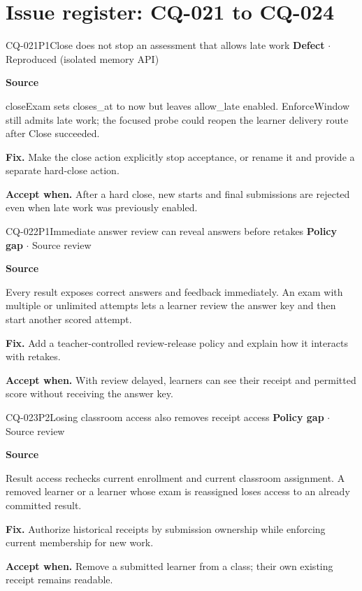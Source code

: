 \section*{Issue register: CQ-021 to CQ-024}
\begin{finding}{CQ-021}{P1}{Close does not stop an assessment that allows late work}
\textbf{Defect} $\cdot$ Reproduced (isolated memory API)\par
\textbf{Source}\quad{}\par
closeExam sets closes\_at to now but leaves allow\_late enabled. EnforceWindow still admits late work; the focused probe could reopen the learner delivery route after Close succeeded.\par
\textbf{Fix.} Make the close action explicitly stop acceptance, or rename it and provide a separate hard-close action.\par
\textbf{Accept when.} After a hard close, new starts and final submissions are rejected even when late work was previously enabled.
\end{finding}
\begin{finding}{CQ-022}{P1}{Immediate answer review can reveal answers before retakes}
\textbf{Policy gap} $\cdot$ Source review\par
\textbf{Source}\quad{}\par
Every result exposes correct answers and feedback immediately. An exam with multiple or unlimited attempts lets a learner review the answer key and then start another scored attempt.\par
\textbf{Fix.} Add a teacher-controlled review-release policy and explain how it interacts with retakes.\par
\textbf{Accept when.} With review delayed, learners can see their receipt and permitted score without receiving the answer key.
\end{finding}
\begin{finding}{CQ-023}{P2}{Losing classroom access also removes receipt access}
\textbf{Policy gap} $\cdot$ Source review\par
\textbf{Source}\quad{}\par
Result access rechecks current enrollment and current classroom assignment. A removed learner or a learner whose exam is reassigned loses access to an already committed result.\par
\textbf{Fix.} Authorize historical receipts by submission ownership while enforcing current membership for new work.\par
\textbf{Accept when.} Remove a submitted learner from a class; their own existing receipt remains readable.
\end{finding}
